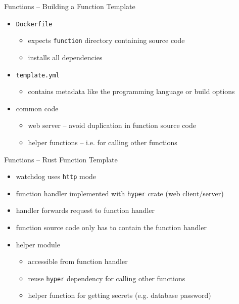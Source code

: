 \begin{frame}{Functions -- Building a Function Template}
  \begin{itemize}
    \item \texttt{Dockerfile}
      \begin{itemize}
        \item expects \texttt{function} directory containing source code
        \item installs all dependencies
      \end{itemize}
    \item \texttt{template.yml}
      \begin{itemize}
        \item contains metadata like the programming language or build options
      \end{itemize}
    \item common code
      \begin{itemize}
        \item web server -- avoid duplication in function source code
        \item helper functions -- i.e. for calling other functions
      \end{itemize}
  \end{itemize}
\end{frame}

\begin{frame}{Functions -- Rust Function Template}
  \begin{itemize}
    \item watchdog uses \texttt{http} mode
    \item function handler implemented with \texttt{hyper} crate (web client/server)
    \item handler forwards request to function handler
    \item function source code only has to contain the function handler
    \item helper module
      \begin{itemize}
        \item accessible from function handler
        \item reuse \texttt{hyper} dependency for calling other functions
        \item helper function for getting secrets (e.g. database password)
      \end{itemize}
  \end{itemize}
\end{frame}

